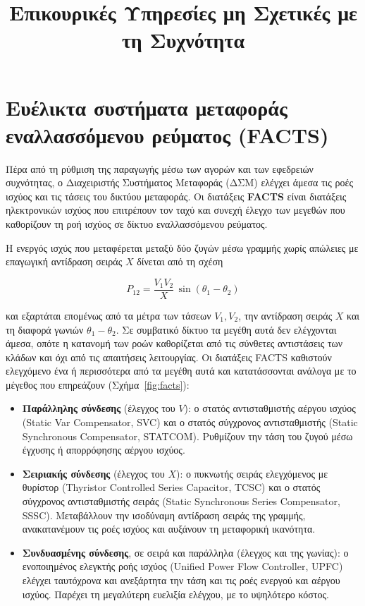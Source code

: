 \title{Επικουρικές Υπηρεσίες μη Σχετικές με τη Συχνότητα}

\section{Ευέλικτα συστήματα μεταφοράς εναλλασσόμενου ρεύματος (FACTS)}
\label{kef-02-theoria}

Πέρα από τη ρύθμιση της παραγωγής μέσω των αγορών και των εφεδρειών συχνότητας, ο Διαχειριστής
Συστήματος Μεταφοράς (ΔΣΜ) ελέγχει άμεσα τις ροές ισχύος και τις τάσεις του δικτύου μεταφοράς. Οι διατάξεις
\textbf{FACTS} είναι διατάξεις ηλεκτρονικών ισχύος που
επιτρέπουν τον ταχύ και συνεχή έλεγχο των μεγεθών που καθορίζουν τη ροή ισχύος σε δίκτυο
εναλλασσόμενου ρεύματος.

Η ενεργός ισχύς που μεταφέρεται μεταξύ δύο ζυγών μέσω γραμμής χωρίς απώλειες με επαγωγική
αντίδραση σειράς $X$ δίνεται από τη σχέση

\begin{equation}
P_{12} = \frac{V_1 V_2}{X}\,\sin(\theta_1 - \theta_2)
\label{eq:facts-powerflow}
\end{equation}

και εξαρτάται επομένως από τα μέτρα των τάσεων $V_1, V_2$, την αντίδραση σειράς $X$ και τη
διαφορά γωνιών $\theta_1 - \theta_2$. Σε
συμβατικό δίκτυο τα μεγέθη αυτά δεν ελέγχονται άμεσα, οπότε η κατανομή των ροών καθορίζεται
από τις σύνθετες αντιστάσεις των κλάδων και όχι από τις απαιτήσεις λειτουργίας. Οι διατάξεις
FACTS καθιστούν ελεγχόμενο ένα ή περισσότερα από τα μεγέθη αυτά και κατατάσσονται ανάλογα με
το μέγεθος που επηρεάζουν (Σχήμα~\ref{fig:facts}):

\begin{itemize}
\item \textbf{Παράλληλης σύνδεσης} (έλεγχος του $V$): ο στατός αντισταθμιστής αέργου ισχύος
      (Static Var Compensator, SVC) και ο στατός σύγχρονος αντισταθμιστής (Static
      Synchronous Compensator, STATCOM). Ρυθμίζουν την τάση του ζυγού μέσω έγχυσης ή
      απορρόφησης αέργου ισχύος.
\item \textbf{Σειριακής σύνδεσης} (έλεγχος του $X$): ο πυκνωτής σειράς ελεγχόμενος με
      θυρίστορ (Thyristor Controlled Series Capacitor, TCSC) και ο στατός σύγχρονος
      αντισταθμιστής σειράς (Static Synchronous Series Compensator, SSSC). Μεταβάλλουν την
      ισοδύναμη αντίδραση σειράς της γραμμής, ανακατανέμουν τις ροές ισχύος και αυξάνουν τη
      μεταφορική ικανότητα.
\item \textbf{Συνδυασμένης σύνδεσης}, σε σειρά και παράλληλα (έλεγχος και της γωνίας): ο
      ενοποιημένος ελεγκτής ροής ισχύος (Unified Power Flow Controller, UPFC) ελέγχει
      ταυτόχρονα και ανεξάρτητα την τάση και τις ροές ενεργού και αέργου ισχύος. Παρέχει τη
      μεγαλύτερη ευελιξία ελέγχου, με το υψηλότερο κόστος.
\end{itemize}

